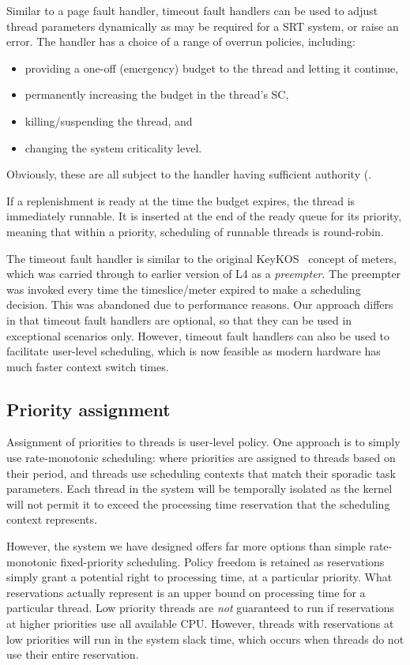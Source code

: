 Similar to a page fault handler, timeout fault handlers can be used to adjust thread parameters dynamically as may be required for a \gls{SRT} system, or raise an error.
The handler has a choice of a range of overrun policies, including:
\begin{itemize}
      \item providing a one-off (emergency) budget to the thread and letting it continue,
       \item permanently increasing the budget in the thread's SC,
       \item killing/suspending the thread, and
       \item changing the system criticality level.
       \end{itemize}
Obviously, these are all subject to the handler having sufficient
authority (\eg {}.

If a replenishment is ready at the time the budget expires, the thread
is immediately runnable. It is inserted at the end of the ready queue
for its priority, meaning that within a priority, scheduling of
runnable threads is round-robin.

The timeout fault handler is similar to the original KeyKOS~\citep{Bomberger_FFHLS_92} concept of
meters, which was carried through to earlier version of L4 as a \emph{preempter}. The preempter was
invoked every time the timeslice/meter expired to make a scheduling decision. This was abandoned due
to performance reasons. Our approach differs in that timeout fault handlers are optional, so that
they can be used in exceptional scenarios only. However, timeout fault handlers can also be used to
facilitate user-level scheduling, which is now feasible as modern hardware has much faster context
switch times. 

\subsection{Priority assignment}

Assignment of priorities to threads is user-level policy. One approach is to simply use
rate-monotonic scheduling: where priorities are assigned to threads based on their period, and
threads use scheduling contexts that match their sporadic task parameters.  Each thread in the
system will be temporally isolated as the kernel will not permit it to exceed the processing time
reservation that the scheduling context represents.

However, the system we have designed offers far more options than simple rate-monotonic fixed-priority
scheduling.  Policy freedom is retained as reservations simply grant a potential right to processing
time, at a particular priority.  What reservations actually represent is an upper bound on
processing time for a particular thread.  Low priority threads are \emph{not} guaranteed to run if
reservations at higher priorities use all available CPU.  However, threads with reservations at low
priorities will run in the system slack time, which occurs when threads do not use their entire
reservation.

